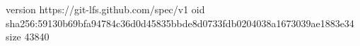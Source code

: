 version https://git-lfs.github.com/spec/v1
oid sha256:59130b69bfa94784c36d0d45835bbde8d0733fdb0204038a1673039ae1883e34
size 43840
